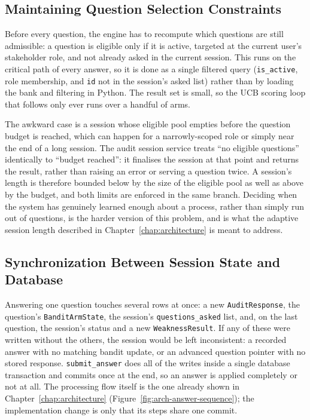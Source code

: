 \documentclass[a4paper, 12pt, oneside, openany, BCOR1cm,toc=chapterentrywithdots]{scrbook}
\begin{document}
\subsection{Maintaining Question Selection Constraints}

Before every question, the engine has to recompute which questions are still admissible: a
question is eligible only if it is active, targeted at the current user's stakeholder role, and
not already asked in the current session. This runs on the critical path of every answer, so it
is done as a single filtered query (\texttt{is\_active}, role membership, and \texttt{id} not
in the session's asked list) rather than by loading the bank and filtering in Python. The
result set is small, so the UCB scoring loop that follows only ever runs over a handful of arms.

The awkward case is a session whose eligible pool empties before the question budget is reached,
which can happen for a narrowly-scoped role or simply near the end of a long session. The audit
session service treats ``no eligible questions'' identically to ``budget reached'': it finalises
the session at that point and returns the result, rather than raising an error or serving a
question twice. A session's length is therefore bounded below by the size of the eligible pool
as well as above by the budget, and both limits are enforced in the same branch. Deciding when
the system has genuinely learned enough about a process, rather than simply run out of
questions, is the harder version of this problem, and is what the adaptive session length
described in Chapter~\ref{chap:architecture} is meant to address.

\subsection{Synchronization Between Session State and Database}

Answering one question touches several rows at once: a new \texttt{AuditResponse}, the
question's \texttt{BanditArmState}, the session's \texttt{questions\_asked} list, and, on the
last question, the session's status and a new \texttt{WeaknessResult}. If any of these were
written without the others, the session would be left inconsistent: a recorded answer with no
matching bandit update, or an advanced question pointer with no stored response.
\texttt{submit\_answer} does all of the writes inside a single database transaction and commits
once at the end, so an answer is applied completely or not at all. The processing flow itself is
the one already shown in Chapter~\ref{chap:architecture}
(Figure~\ref{fig:arch-answer-sequence}); the implementation change is only that its steps share
one commit.
\end{document}
